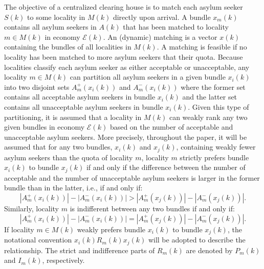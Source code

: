 \documentclass[12pt,fleqn]{article}
\begin{document}
The objective of a centralized clearing house is to match each asylum seeker $S(k)$ to some locality in $M(k)$ directly upon arrival. A bundle $x_m(k)$ contains all asylum seekers in $A(k)$ that has been matched to locality $m\in M(k)$ in economy $\mathcal{E}(k)$. An (dynamic) matching is a vector $x(k)$ containing the bundles of all localities in $M(k)$. A matching is feasible if no locality has been matched to more asylum seekers that their quota. Because localities classify each asylum seeker as either acceptable or unacceptable, any locality $m\in M(k)$ can partition all asylum seekers in a given bundle $x_i(k)$ into two disjoint sets $A^+_m(x_i(k))$ and $A^-_m(x_i(k))$ where the former set contains all acceptable asylum seekers in bundle $x_i(k)$ and the latter set contains all unacceptable asylum seekers in bundle $x_i(k)$. Given this type of partitioning, it is assumed that a locality in $M(k)$ can weakly rank any two given bundles in economy $\mathcal{E}(k)$ based on the number of acceptable and unacceptable asylum seekers. More precisely, throughout the paper, it will be assumed that for any two bundles, $x_i(k)$ and $x_j(k)$, containing weakly fewer asylum seekers than the quota of locality $m$, locality $m$ strictly prefers bundle $x_i(k)$ to bundle $x_j(k)$ if and only if the difference between the number of acceptable and the number of unacceptable asylum seekers is larger in the former bundle than in the latter, i.e., if and only if:
\begin{equation}
|A_m^+(x_i(k))|-|A_m^-(x_i(k))|>|A_m^+(x_j(k))|-|A_m^-(x_j(k))|.\label{EQ:preference}
\end{equation}
\noindent Similarly, locality $m$ is indifferent between any two bundles if and only if:
\begin{equation}
|A_m^+(x_i(k))|-|A_m^-(x_i(k))|=|A_m^+(x_j(k))|-|A_m^-(x_j(k))|.
\end{equation}
\noindent If locality $m\in M(k)$ weakly prefers bundle $x_i(k)$ to bundle $x_j(k)$, the notational convention $x_i(k)R_m(k) x_j(k)$ will be adopted to describe the relationship. The strict and indifference parts of $R_m(k)$ are denoted by $P_m(k)$ and $I_m(k)$, respectively.
\end{document}

